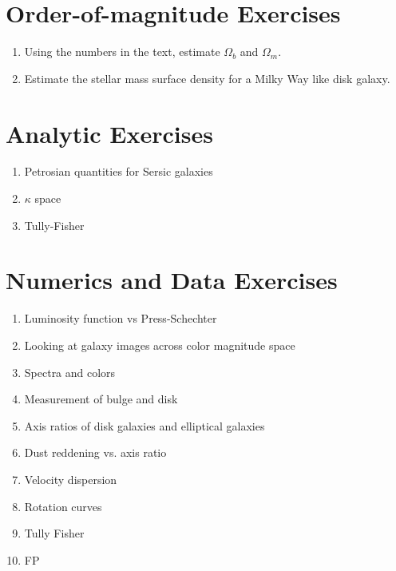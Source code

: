 \section{Order-of-magnitude Exercises}

\begin{enumerate} 
\item Using the numbers in the text, estimate $\Omega_b$ and
    $\Omega_m$. 
\item Estimate the stellar mass surface density for a Milky Way like
disk galaxy.
\end{enumerate} 

\section{Analytic Exercises}

\begin{enumerate}
\item Petrosian quantities for Sersic galaxies
\item $\kappa$ space
\item Tully-Fisher
\end{enumerate}

\section{Numerics and Data Exercises}

\begin{enumerate}
\item Luminosity function vs Press-Schechter
\item Looking at galaxy images across color magnitude space
\item Spectra and colors
\item Measurement of bulge and disk 
\item Axis ratios of disk galaxies and elliptical galaxies
\item Dust reddening vs. axis ratio
\item Velocity dispersion
\item Rotation curves
\item Tully Fisher
\item FP
\end{enumerate}


  
